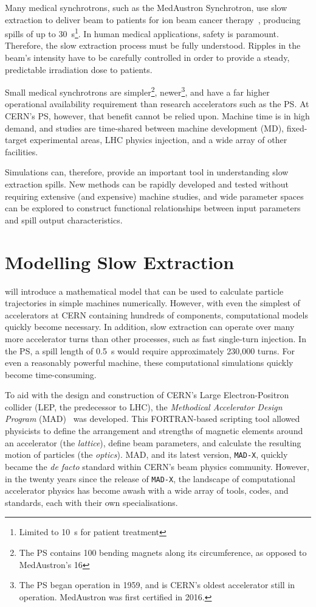 \documentclass[a4paper,twoside,11pt]{report}
\begin{document}
Many medical synchrotrons, such as the MedAustron Synchrotron, use slow extraction to deliver beam to patients for ion beam cancer therapy~\cite{ArrutiaSota:2845862}, producing spills of up to \qty{30}{\second}\footnote{Limited to \qty{10}{\second} for patient treatment}. In human medical applications, safety is paramount. Therefore, the slow extraction process must be fully understood. Ripples in the beam's intensity have to be carefully controlled in order to provide a steady, predictable irradiation dose to patients.

Small medical synchrotrons are simpler\footnote{The PS contains 100 bending magnets along its circumference, as opposed to MedAustron's 16}, newer\footnote{The PS began operation in 1959, and is CERN's oldest accelerator still in operation. MedAustron was first certified in 2016.}, and have a far higher operational availability requirement than research accelerators such as the PS. At CERN's PS, however, that benefit cannot be relied upon. Machine time is in high demand, and studies are time-shared between machine development (MD), fixed-target experimental areas, LHC physics injection, and a wide array of other facilities. 

Simulations can, therefore, provide an important tool in understanding slow extraction spills. New methods can be rapidly developed and tested without requiring extensive (and expensive) machine studies, and wide parameter spaces can be explored to construct functional relationships between input parameters and spill output characteristics. 

\section{Modelling Slow Extraction}\label{sec:modelling-slow-extraction}

 will introduce a mathematical model that can be used to calculate particle trajectories in simple machines numerically. However, with even the simplest of accelerators at CERN containing hundreds of components, computational models quickly become necessary. In addition, slow extraction can operate over many more accelerator turns than other processes, such as fast single-turn injection. In the PS, a spill length of \qty{0.5}{\second} would require approximately 230,000 turns. For even a reasonably powerful machine, these computational simulations quickly become time-consuming. 

To aid with the design and construction of CERN's Large Electron-Positron collider (LEP, the predecessor to LHC), the \textit{Methodical Accelerator Design Program} (MAD)~\cite{Iselin:MAD} was developed. This FORTRAN-based scripting tool allowed physicists to define the arrangement and strengths of magnetic elements around an accelerator (the \textit{lattice}), define beam parameters, and calculate the resulting motion of particles (the \textit{optics}). MAD, and its latest version, \verb|MAD-X|, quickly became the \textit{de facto} standard within CERN's beam physics community. However, in the twenty years since the release of \verb|MAD-X|, the landscape of computational accelerator physics has become awash with a wide array of tools, codes, and standards, each with their own specialisations. 
\end{document}
